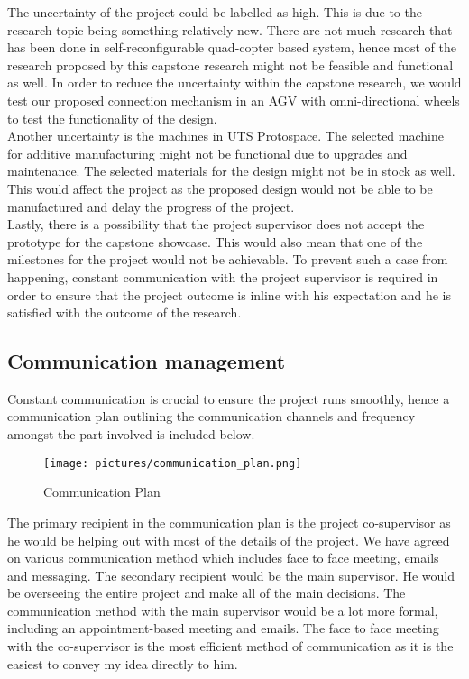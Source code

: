 \documentclass[12pt,A4]{article}
\begin{document}
	The uncertainty of the project could be labelled as high. This is due to the research topic being something relatively new. There are not much research that has been done in self-reconfigurable quad-copter based system, hence most of the research proposed by this capstone research might not be feasible and functional as well. In order to reduce the uncertainty within the capstone research, we would test our proposed connection mechanism in an AGV with omni-directional wheels to test the functionality of the design.\\
	
	Another uncertainty is the machines in UTS Protospace. The selected machine for additive manufacturing might not be functional due to upgrades and maintenance. The selected materials for the design might not be in stock as well. This would affect the project as the proposed design would not be able to be manufactured and delay the progress of the project.\\
	
	Lastly, there is a possibility that the project supervisor does not accept the prototype for the capstone showcase. This would also mean that one of the milestones for the project would not be achievable. To prevent such a case from happening, constant communication with the project supervisor is required in order to ensure that the project outcome is inline with his expectation and he is satisfied with the outcome of the research.\\
	
	\subsection{Communication management}
	
	Constant communication is crucial to ensure the project runs smoothly, hence a communication plan outlining the communication channels and frequency amongst the part involved is included below.\\
	
	\begin{figure}[h!]
		\texttt{[image: pictures/communication\_plan.png]}
		\caption{Communication Plan}
	\end{figure}
	
	The primary recipient in the communication plan is the project co-supervisor as he would be helping out with most of the details of the project. We have agreed on various communication method which includes face to face meeting, emails and messaging. The secondary recipient would be the main supervisor. He would be overseeing the entire project and make all of the main decisions. The communication method with the main supervisor would be a lot more formal, including an appointment-based meeting and emails. The face to face meeting with the co-supervisor is the most efficient method of communication as it is the easiest to convey my idea directly to him.\\
	
\end{document}
